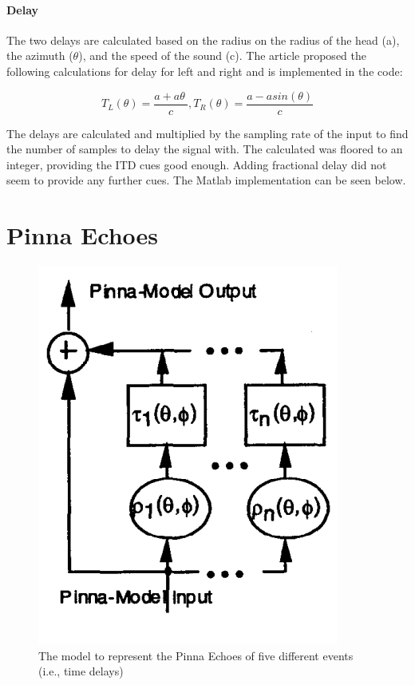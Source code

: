 \documentclass{assignment}
\begin{document}
\paragraph{Delay \newline}

The two delays are calculated based on the radius on the radius of the head (a), the azimuth ($\theta$), and the speed of the sound (c). The article proposed the following calculations for delay for left and right and is implemented in the code: 

\[T_{L}(\theta) = \frac{a + a\theta\ }{c},  T_{R}(\theta) = \frac{a - asin(\theta) }{c}\]

The delays are calculated and multiplied by the sampling rate of the input to find the number of samples to delay the signal with. The calculated was floored to an integer, providing the ITD cues good enough. Adding fractional delay did not seem to provide any further cues. The Matlab implementation can be seen below.



\section*{Pinna Echoes}

\begin{figure}[h]
    \centering
    \includegraphics[size = 0.7]{assets/pinnamodel.png}
    \caption{The model to represent the Pinna Echoes of five different events (i.e., time delays)}
    \label{fig:pinnaModel}
\end{figure}
\end{document}
